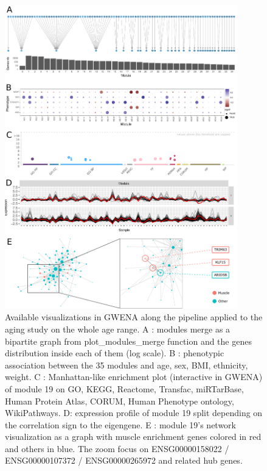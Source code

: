 \begin{figure}[p]
    \centering
    \includegraphics[width=0.90\textwidth]{img/chap1/figure_2.pdf}
    \caption[Available visualizations in GWENA along the pipeline applied to the aging study on the whole age range]{Available visualizations in GWENA along the pipeline applied to the aging study on the whole age range. A : modules merge as a bipartite graph from plot\_modules\_merge function and the genes distribution inside each of them (log scale). B : phenotypic association between the 35 modules and age, sex, BMI, ethnicity, weight. C : Manhattan-like enrichment plot (interactive in GWENA) of module 19 on GO, KEGG, Reactome, Transfac, miRTarBase, Human Protein Atlas, CORUM, Human Phenotype ontology, WikiPathways. D: expression profile of module 19 split depending on the correlation sign to the eigengene. E : module 19's network visualization as a graph with muscle enrichment genes colored in red and others in blue. The zoom focus on ENSG00000158022 / ENSG00000107372 / ENSG00000265972 and related hub genes.}
    \label{fig:fig_resume_visu}
\end{figure}


